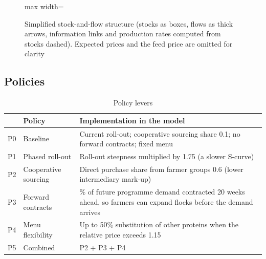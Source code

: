 \documentclass[10pt,twocolumn,a4paper]{article}
\begin{document}
\begin{figure}[!t]
\begin{adjustbox}{max width=\textwidth}
\end{adjustbox}
\caption{Simplified stock-and-flow structure (stocks as boxes, flows as thick arrows, information links and production rates computed from stocks dashed). Expected prices and the feed price are omitted for clarity}\label{fig:sfd}
\end{figure}

\subsection{Policies}

\begin{table}[!htb]
\centering
\footnotesize
\caption{Policy levers}\label{tab:policies}
\begin{tabularx}{\linewidth}{l>{\raggedright\arraybackslash}p{1.9cm}>{\raggedright\arraybackslash}X}
\toprule
\textbf{} & \textbf{Policy} & \textbf{Implementation in the model} \\
\midrule
P0 & Baseline & Current roll-out; cooperative sourcing share 0.1; no forward contracts; fixed menu \\
P1 & Phased roll-out & Roll-out steepness multiplied by 1.75 (a slower S-curve) \\
P2 & Cooperative sourcing & Direct purchase share from farmer groups 0.6 (lower intermediary mark-up) \\
P3 & Forward contracts & 80\% of future programme demand contracted 20 weeks ahead, so farmers can expand flocks before the demand arrives \\
P4 & Menu flexibility & Up to 50\% substitution of other proteins when the relative price exceeds 1.15 \\
P5 & Combined & P2 + P3 + P4 \\
\bottomrule
\end{tabularx}
\end{table}
\end{document}
